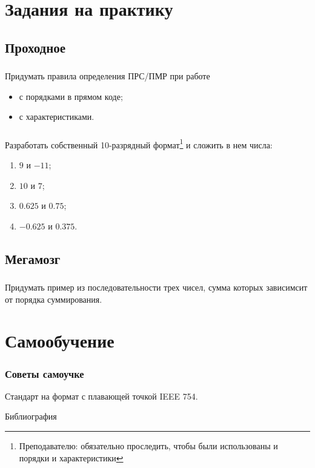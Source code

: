 \appendix


\section{Задания на практику}


\subsection{Проходное}

\begin{frame}
    \frametitle{\TaskSimpleNumber}
    
    Придумать правила определения ПРС/ПМР при работе 
    \begin{itemize}
        \item с порядками в прямом коде;
        \item с характеристиками.
    \end{itemize}
\end{frame}

\begin{frame}
    \frametitle{\TaskSimpleNumber}

    Разработать собственный 10-разрядный формат\footnote{Преподавателю: обязательно проследить, чтобы были использованы и порядки и характеристики} и сложить в нем числа:

    \begin{enumerate}
        \item $9$ и $-11$;
        \item $10$ и $7$;
        \item $0.625$ и $0.75$;
        \item $-0.625$ и $0.375$.
    \end{enumerate}
\end{frame}

\subsection{Мегамозг}

\begin{frame}
    \frametitle{\TaskSimpleNumber}
    
    Придумать пример из последовательности трех чисел, сумма которых зависимсит от порядка суммирования. 
\end{frame}

\section{Самообучение}

\begin{frame}
    \frametitle{Советы самоучке}
    
    Стандарт на формат с плавающей точкой IEEE 754.
\end{frame}

\begin{frame}[allowframebreaks]{Библиография}
    
    
\end{frame}

